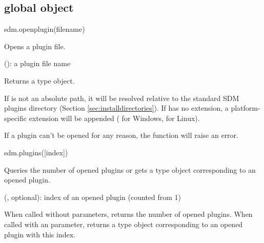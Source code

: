 \documentclass[a4paper,12pt,twoside,extrafontsizes]{memoir}
\begin{document}
\subsection{ global object}


\begin{luafuncprototype}
sdm.openplugin(filename)
\end{luafuncprototype}

\begin{funcdescr}
	Opens a plugin file.
\end{funcdescr}

\begin{funcparams}
	 (): a plugin file name
\end{funcparams}

\begin{funcret}
	Returns a  type object.
\end{funcret}

\begin{funcremarks}
	If  is not an absolute path, it will be resolved relative to the standard SDM plugins directory (Section \ref{sec:installdirectories}). If  has no extension, a platform-specific extension will be appended ( for Windows,  for Linux).
	
	If a plugin can't be opened for any reason, the function will raise an error.
\end{funcremarks}


\begin{luafuncprototype}
sdm.plugins([index])
\end{luafuncprototype}

\begin{funcdescr}
	Queries the number of opened plugins or gets a  type object corresponding to an opened plugin.
\end{funcdescr}

\begin{funcparams}
	 (, optional): index of an opened plugin (counted from 1)
\end{funcparams}

\begin{funcret}
	When called without parameters, returns the number of opened plugins. When called with an  parameter, returns a  type object corresponding to an opened plugin with this index.
\end{funcret}
\end{document}
